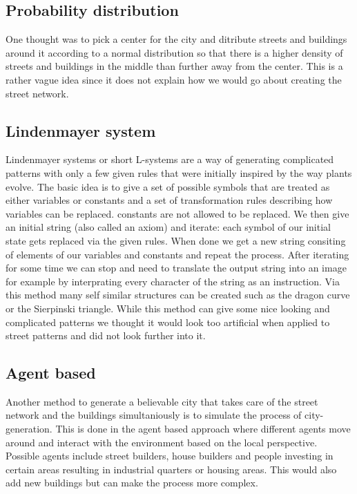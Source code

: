\documentclass{scrartcl}
\begin{document}
\subsection{Probability distribution}
One thought was to pick a center for the city and ditribute streets and buildings
around it according to a normal distribution so that there is a higher density of streets
and buildings in the middle than further away from the center. This is a rather vague
idea since it does not explain how we would go about creating the street network.

\subsection{Lindenmayer system}
Lindenmayer systems or short L-systems are a way of generating complicated patterns
with only a few given rules that were initially inspired by the way plants evolve.
The basic idea is to give a set of possible symbols that are treated as either variables
or constants and a set of transformation rules describing how variables can be replaced.
constants are not allowed to be replaced. We then give an initial string (also
called an axiom) and iterate: each symbol of our initial state gets replaced via the given rules.
When done we get a new string consiting of elements of our variables and constants
and repeat the process. After iterating for some time we can stop and need to
translate the output string into an image for example by interprating every character
of the string as an instruction. Via this method many self similar
structures can be created such as the dragon curve or the Sierpinski triangle.
While this method can give some nice looking and complicated patterns we thought
it would look too artificial when applied to street patterns and did not look further
into it.


\subsection{Agent based}
Another method to generate a believable city that takes care of the street network
and the buildings simultaniously is to simulate the process of
city-generation. This is done in the agent based approach where different agents
move around and interact with the environment based on the local perspective.
Possible agents include street builders, house builders and people investing in certain
areas resulting in industrial quarters or housing areas. This would also add new
buildings but can make the process more complex.
\end{document}

